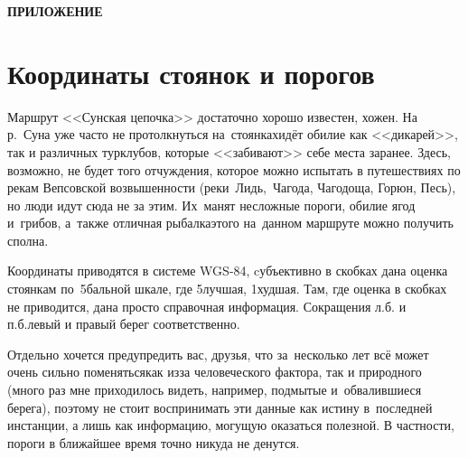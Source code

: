 {
\cleardoublepage
{}

\fancyhead[LE]{\fancyplain{}{}}
\fancyhead[RO]{\fancyplain{}{}}

{\hfill\large\textbf{ПРИЛОЖЕНИЕ}}
\section*{Координаты стоянок и порогов}
Маршрут <<Сунская цепочка>> достаточно хорошо известен, хожен. На р.\nobreakdash~Суна уже часто не протолкнуться на~стоянках\mdash идёт обилие как <<дикарей>>, так и различных турклубов, которые <<забивают>> себе места заранее. Здесь, возможно, не будет того отчуждения, которое можно испытать в путешествиях по рекам Вепсовской возвышенности (реки~Лидь,~Чагода, Чагодоща, Горюн, Песь\cite{СоболевЛидьЧагодаЧагодоща}), но люди идут сюда не за этим. Их~манят несложные пороги, обилие ягод и~грибов, а~также отличная рыбалка\mdash этого на~данном маршруте можно получить сполна. 

Координаты приводятся в системе WGS-84, cубъективно в скобках дана оценка стоянкам по~5\sdash бальной шкале, где 5\mdash лучшая, 1\mdash худшая. Там, где оценка в скобках не приводится, дана просто справочная информация. Сокращения л.б. и п.б.\mdash левый и правый берег соответственно.

Отдельно хочется предупредить вас, друзья, что за~несколько лет всё может очень сильно поменяться\mdash как из\sdash за человеческого фактора, так и природного (много раз мне приходилось видеть, например, подмытые и~обвалившиеся берега), поэтому не стоит воспринимать эти данные как истину в~последней инстанции, а лишь как информацию, могущую оказаться полезной. В частности, пороги в ближайшее время точно никуда не денутся.
%
\newpage 
}
